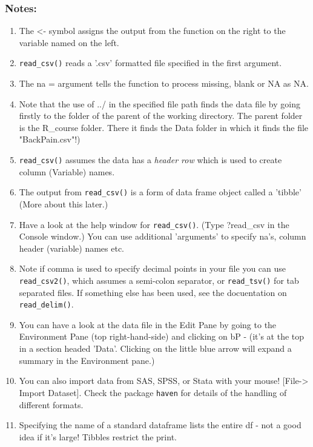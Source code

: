 \documentclass[titlepage]{book}
\begin{document}
  \subsubsection{Notes:}
\begin{enumerate}
\item{The <- symbol assigns the output from the function on the right to the variable named on the left.}
\item{\texttt{read\_csv()} reads a '.csv' formatted file specified in the first argument.}
\item{The na = argument tells the function to process missing, blank or NA as NA.}
\item{Note that the use of ../ in the specified file path finds the data file by going firstly to the folder of the parent of the working directory. The parent folder is the R\_course folder. There it finds the Data folder in which it finds the file "BackPain.csv"!)}
\item{\texttt{read\_csv()} assumes the data has a \textsl{header row} which is used to create column (Variable) names.}
\item{The output from \texttt{read\_csv()} is a form of data frame object called a 'tibble' (More about this later.)}
\item{Have a look at the help window for \texttt{read\_csv()}. (Type ?read\_csv in the Console window.) You can use  additional 'arguments' to specify na's, column header (variable) names etc.}
\item{Note if comma is used to specify decimal points in your file you can use {\texttt{read\_csv2()}}, which assumes a semi-colon separator, or {\texttt{read\_tsv()}} for tab separated files. If something else has been used, see the docuentation on {\texttt{read\_delim()}}.}
\item{You can have a look at the data file in the Edit Pane by going to the Environment Pane (top right-hand-side) and clicking on bP - (it's at the top in a section headed 'Data'. Clicking on the little blue arrow will expand a summary in the Environment pane.)}
\item{You can also import data from SAS, SPSS, or Stata  with your mouse! [File-> Import Dataset]. Check the package \texttt{haven} for details of the handling of different formats.}
\item{ Specifying the name of a standard dataframe lists the entire df - not a good idea if it's large! Tibbles restrict the print.}
\end{enumerate}
\end{document}
